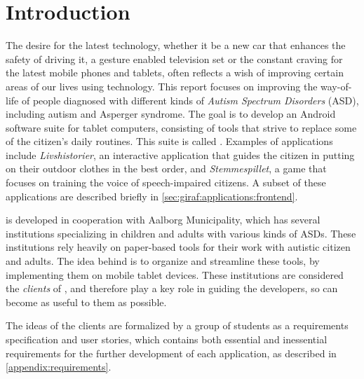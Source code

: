 \newcommand{\headerIntroduction}{Introduction}
\chapter*{\headerIntroduction}\label{chap:introduction}
\addcontentsline{toc}{chapter}{\headerIntroduction}

The desire for the latest technology, whether it be a new car that enhances the safety of driving it, a gesture enabled television set or the constant craving for the latest mobile phones and tablets, often reflects a wish of improving certain areas of our lives using technology.
This report focuses on improving the way-of-life of people diagnosed with different kinds of \textit{Autism Spectrum Disorders} (ASD), including autism and Asperger syndrome.
The goal is to develop an Android software suite for tablet computers, consisting of tools that strive to replace some of the citizen's daily routines. 
This suite is called \giraf.
Examples of \giraf applications include \textit{Livshistorier}, an interactive application that guides the citizen in putting on their outdoor clothes in the best order, and \textit{Stemmespillet}, a game that focuses on training the voice of speech-impaired citizens.
A subset of these applications are described briefly in \cref{sec:giraf:applications:frontend}.

\giraf is developed in cooperation with Aalborg Municipality, which has several institutions specializing in children and adults with various kinds of ASDs.
These institutions rely heavily on paper-based tools for their work with autistic citizen and adults. 
The idea behind \giraf is to organize and streamline these tools, by implementing them on mobile tablet devices.
These institutions are considered the \textit{clients} of \giraf, and therefore play a key role in guiding the developers, so \giraf can become as useful to them as possible.

The ideas of the clients are formalized by a group of students as a requirements specification and user stories, which contains both essential and inessential requirements for the further development of each application, as described in \cref{appendix:requirements}.